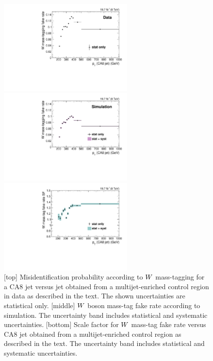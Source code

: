 \begin{figure}[htbp]
\centering
\includegraphics[width=0.6\textwidth]{figures/razor_wtag/Eff_Data_ratio_pt_Wmass_all_Data_Thesis}

\includegraphics[width=0.6\textwidth]{figures/razor_wtag/Eff_MC_ratio_pt_Wmass_all_MC_Thesis}

\includegraphics[width=0.6\textwidth]{figures/razor_wtag/SF_Wmass_Thesis}
\caption{[top] Misidentification probability according to $W$ mass-tagging for a CA8 jet versus
jet \pt obtained from a multijet-enriched control region in data as described in the text. The shown
uncertainties are statistical only.
[middle] $W$ boson mass-tag fake rate according to simulation. The uncertainty band includes
statistical and systematic uncertainties.
[bottom] Scale factor for $W$ mass-tag fake rate versus CA8 jet \pt obtained from a
multijet-enriched control region as described in the text. The uncertainty band includes
statistical and systematic uncertainties.
\label{fig:boost_wmasstag}}
\end{figure}

